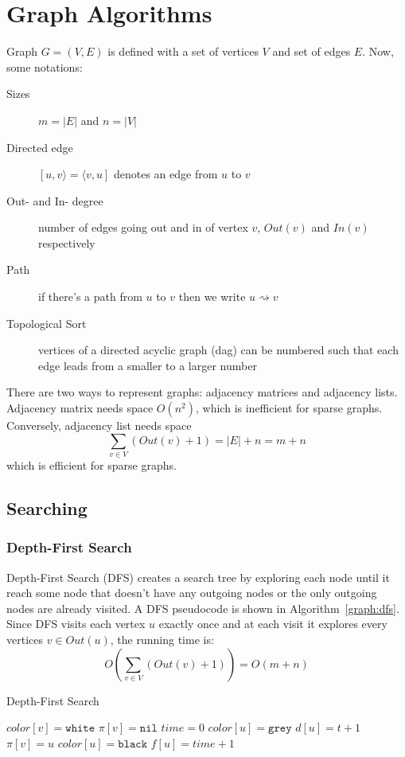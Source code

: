 
\section{Graph Algorithms}
Graph $G=(V,E)$ is defined with a set of vertices $V$ and set of edges $E$.
Now, some notations:
\begin{description}
  \item[Sizes] $m=|E|$ and $n=|V|$
  \item[Directed edge] $[u,v\rangle=\langle v,u]$ denotes an edge from $u$ to
    $v$
  \item[Out- and In- degree] number of edges going out and in of vertex $v$,
    $Out(v)$ and $In(v)$ respectively
  \item[Path] if there's a path from $u$ to $v$ then we write
    $u\rightsquigarrow v$
  \item[Topological Sort] vertices of a directed acyclic graph (dag) can be
    numbered such that each edge leads from a smaller to a larger number
\end{description}

There are two ways to represent graphs: adjacency matrices and adjacency lists.
Adjacency matrix needs space $O(n^2)$, which is inefficient for sparse graphs.
Conversely, adjacency list needs space $$\sum_{v\in V} (Out(v) + 1)=|E|+n=m+n$$
which is efficient for sparse graphs.


\subsection{Searching}
\subsubsection{Depth-First Search}
Depth-First Search (DFS) creates a search tree by exploring each node until it
reach some node that doesn't have any outgoing nodes or the only outgoing nodes
are already visited.  A DFS pseudocode is shown in Algorithm~\ref{graph:dfs}.
Since DFS visits each vertex $u$ exactly once and at each visit it explores
every vertices $v\in Out(u)$, the running time is:
$$O(\sum_{v\in V}(Out(v)+1))=O(m+n)$$

\begin{algorithm}
  \caption{Depth-First Search}\label{graph:dfs}
  \begin{algorithmic}
      \State $color[v]=\texttt{white}$
      \State $\pi[v]=\texttt{nil}$
    \EndFor
    \State $time = 0$
        \State{}
      \EndIf
    \EndFor
    \EndFunction
    \State
      \State $color[u]=\texttt{grey}$
      \State $d[u]=t+1$
        \State{}
        \State $\pi[v]=u$
      \EndIf
      \State $color[u]=\texttt{black}$
      \State $f[u]=time+1$
      \EndFor
    \EndFunction
  \end{algorithmic}
\end{algorithm}

